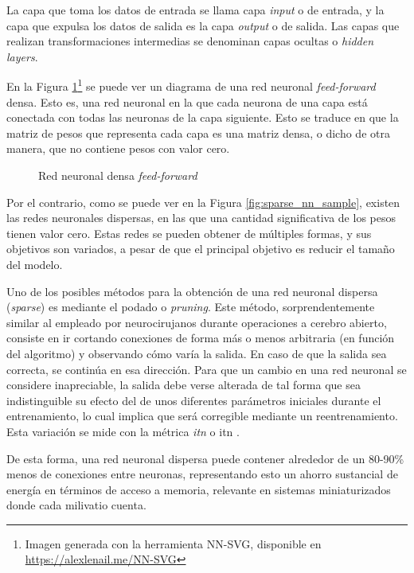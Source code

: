 La capa que toma los datos de entrada se llama capa \textit{input} o de entrada, y la capa que expulsa los datos de salida es la capa \textit{output} o de salida. Las capas que realizan transformaciones intermedias se denominan capas ocultas o \textit{hidden layers}.

En la Figura \ref{fig:dense_nn_sample}\footnote{Imagen generada con la herramienta NN-SVG, disponible en \url{https://alexlenail.me/NN-SVG}} se puede ver un diagrama de una red neuronal \textit{feed-forward} densa. Esto es, una red neuronal en la que cada neurona de una capa está conectada con todas las neuronas de la capa siguiente. Esto se traduce en que la matriz de pesos que representa cada capa es una matriz densa, o dicho de otra manera, que no contiene pesos con valor cero.

\begin{figure}[h!]
    \centering
    \vspace*{0.5cm}
    \def\svgwidth{0.85\textwidth}
    
    \caption{Red neuronal densa \textit{feed-forward}}
    \label{fig:dense_nn_sample}
\end{figure}

Por el contrario, como se puede ver en la Figura \ref{fig:sparse_nn_sample}, existen las redes neuronales dispersas, en las que una cantidad significativa de los pesos tienen valor cero. Estas redes se pueden obtener de múltiples formas, y sus objetivos son variados, a pesar de que el principal objetivo es reducir el tamaño del modelo.

Uno de los posibles métodos para la obtención de una red neuronal dispersa (\textit{sparse}) es mediante el podado o \textit{pruning}. Este método, sorprendentemente similar al empleado por neurocirujanos durante operaciones a cerebro abierto, consiste en ir cortando conexiones de forma más o menos arbitraria (en función del algoritmo) y observando cómo varía la salida. En caso de que la salida sea correcta, se continúa en esa dirección. Para que un cambio en una red neuronal se considere inapreciable, la salida debe verse alterada de tal forma que sea indistinguible su efecto del de unos diferentes parámetros iniciales durante el entrenamiento, lo cual implica que será corregible mediante un reentrenamiento. Esta variación se mide con la métrica \textit{\acrlong{itn}} o \acrshort{itn} \cite[4.1.1]{deep_learning_for_computer_architects}.

De esta forma, una red neuronal dispersa puede contener alrededor de un 80-90\% menos de conexiones entre neuronas, representando esto un ahorro sustancial de energía en términos de acceso a memoria, relevante en sistemas miniaturizados donde cada milivatio cuenta.

